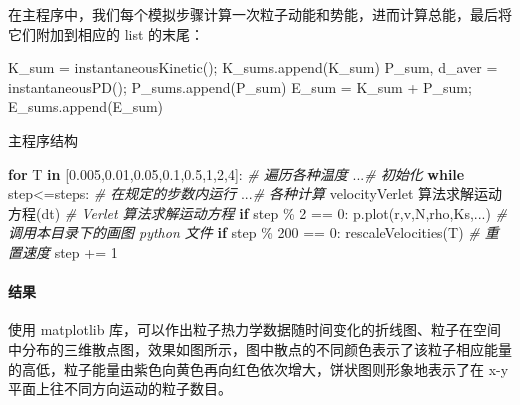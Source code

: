 \documentclass[
]{article}
\newenvironment{Shaded}{}{}
\newcommand{\CommentTok}[1]{\textcolor[rgb]{0.38,0.63,0.69}{\textit{#1}}}
\newcommand{\ControlFlowTok}[1]{\textcolor[rgb]{0.00,0.44,0.13}{\textbf{#1}}}
\newcommand{\DecValTok}[1]{\textcolor[rgb]{0.25,0.63,0.44}{#1}}
\newcommand{\FloatTok}[1]{\textcolor[rgb]{0.25,0.63,0.44}{#1}}
\newcommand{\KeywordTok}[1]{\textcolor[rgb]{0.00,0.44,0.13}{\textbf{#1}}}
\newcommand{\NormalTok}[1]{#1}
\newcommand{\OperatorTok}[1]{\textcolor[rgb]{0.40,0.40,0.40}{#1}}
\begin{document}
在主程序中，我们每个模拟步骤计算一次粒子动能和势能，进而计算总能，最后将它们附加到相应的
list 的末尾：

\begin{Shaded}
\begin{Highlighting}[]
\NormalTok{K\_sum }\OperatorTok{=}\NormalTok{ instantaneousKinetic()}\OperatorTok{;}\NormalTok{ K\_sums.append(K\_sum)}
\NormalTok{P\_sum, d\_aver }\OperatorTok{=}\NormalTok{ instantaneousPD()}\OperatorTok{;}\NormalTok{ P\_sums.append(P\_sum)}
\NormalTok{E\_sum }\OperatorTok{=}\NormalTok{ K\_sum }\OperatorTok{+}\NormalTok{ P\_sum}\OperatorTok{;}\NormalTok{ E\_sums.append(E\_sum)}
\end{Highlighting}
\end{Shaded}

主程序结构

\begin{Shaded}
\begin{Highlighting}[]
\ControlFlowTok{for}\NormalTok{ T }\KeywordTok{in}\NormalTok{ [}\FloatTok{0.005}\NormalTok{,}\FloatTok{0.01}\NormalTok{,}\FloatTok{0.05}\NormalTok{,}\FloatTok{0.1}\NormalTok{,}\FloatTok{0.5}\NormalTok{,}\DecValTok{1}\NormalTok{,}\DecValTok{2}\NormalTok{,}\DecValTok{4}\NormalTok{]: }\CommentTok{\# 遍历各种温度}
\NormalTok{	...}\CommentTok{\# 初始化}
	\ControlFlowTok{while}\NormalTok{ step}\OperatorTok{\textless{}=}\NormalTok{steps: }\CommentTok{\# 在规定的步数内运行}
\NormalTok{		...}\CommentTok{\# 各种计算}
\NormalTok{		velocityVerlet 算法求解运动方程(dt) }\CommentTok{\# Verlet 算法求解运动方程}
		\ControlFlowTok{if}\NormalTok{ step }\OperatorTok{\%} \DecValTok{2} \OperatorTok{==} \DecValTok{0}\NormalTok{:}
\NormalTok{			p.plot(r,v,N,rho,Ks,...) }\CommentTok{\# 调用本目录下的画图 python 文件}
		\ControlFlowTok{if}\NormalTok{ step }\OperatorTok{\%} \DecValTok{200} \OperatorTok{==} \DecValTok{0}\NormalTok{:}
\NormalTok{			rescaleVelocities(T) }\CommentTok{\# 重置速度}
\NormalTok{		step }\OperatorTok{+=} \DecValTok{1}
\end{Highlighting}
\end{Shaded}

\hypertarget{header-n86}{%
\paragraph{结果}\label{header-n86}}

使用 matplotlib
库，可以作出粒子热力学数据随时间变化的折线图、粒子在空间中分布的三维散点图，效果如图所示，图中散点的不同颜色表示了该粒子相应能量的高低，粒子能量由紫色向黄色再向红色依次增大，饼状图则形象地表示了在
x-y 平面上往不同方向运动的粒子数目。
\end{document}
